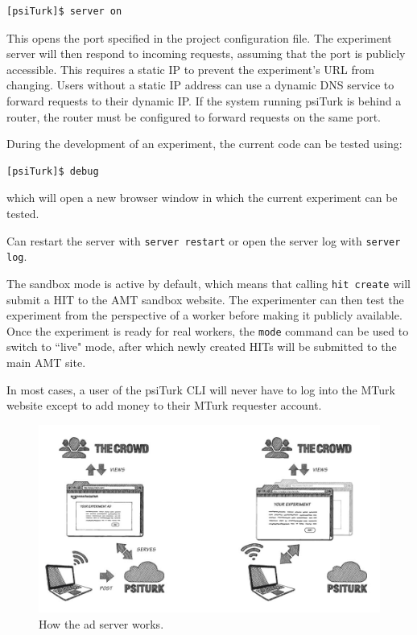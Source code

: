 \documentclass[twocolumn]{svjour3}          %
\begin{document}
\begin{lstlisting}
[psiTurk]$ server on
\end{lstlisting}

\noindent This opens the port specified in the project configuration file.
The experiment server will then respond to incoming requests, assuming that the port is publicly accessible.
This requires a static IP to prevent the experiment's URL from changing.
Users without a static IP address can use a dynamic DNS service to forward requests to their dynamic IP.
If the system running psiTurk is behind a router, the router must be configured to forward requests on the same port.

During the development of an experiment, the current code can be tested using:

\begin{lstlisting}
[psiTurk]$ debug
\end{lstlisting}

\noindent which will open a new browser window in which the current experiment can be tested.

Can restart the server with \texttt{server restart} or open the server log with \texttt{server log}. 

The sandbox mode is active by default, which means that calling \texttt{hit create} will submit a HIT to the AMT sandbox website.
The experimenter can then test the experiment from the perspective of a worker before making it publicly available.
Once the experiment is ready for real workers, the \texttt{mode} command can be used to switch to ``live" mode, after which newly created HITs will be submitted to the main AMT site.

In most cases, a user of the
psiTurk CLI will never have to log into the MTurk website except to add money to their MTurk
requester account.


\begin{figure}[tp]
\centering
\includegraphics[scale=.40]{figures/psiturk_cloud_sequence.jpg}
\caption{How the ad server works.}
\label{fig:adserver}
\end{figure}
\end{document}
